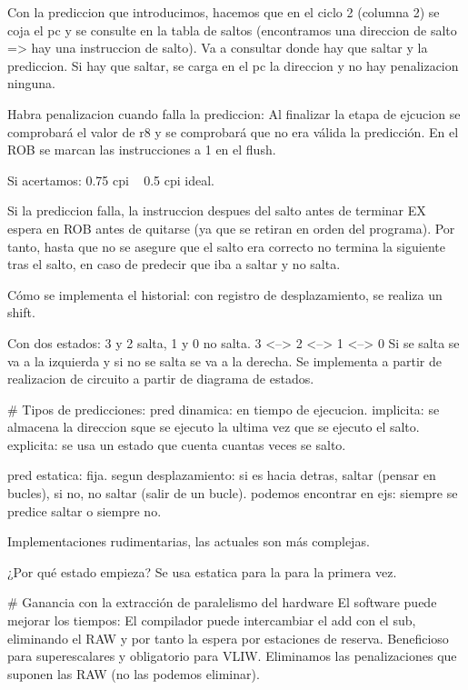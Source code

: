 Con la prediccion que introducimos, hacemos que en el ciclo 2 (columna 2) se coja el pc y se consulte en la tabla de saltos (encontramos una direccion de salto => hay una instruccion de salto). 
Va a consultar donde hay que saltar y la prediccion.
Si hay que saltar, se carga en el pc la direccion y no hay penalizacion ninguna.


Habra penalizacion cuando falla la prediccion:
Al finalizar la etapa de ejcucion se comprobará el valor de r8 y se comprobará que no era válida la predicción. En el ROB se marcan las instrucciones a 1 en el flush.

Si acertamos: 0.75 cpi ~ 0.5 cpi ideal.

Si la prediccion falla, la instruccion despues del salto antes de terminar EX espera en ROB antes de quitarse (ya que se retiran en orden del programa). Por tanto, hasta que no se asegure que el salto era correcto no termina la siguiente tras el salto, en caso de predecir que iba a saltar y no salta.



Cómo se implementa el historial: con registro de desplazamiento, se realiza un shift.

Con dos estados:
3 y 2 salta, 1 y 0 no salta.
3 <--> 2 <--> 1 <--> 0
Si se salta se va a la izquierda y si no se salta se va a la derecha.
Se implementa a partir de realizacion de circuito a partir de diagrama de estados.



# Tipos de predicciones:
pred dinamica: en tiempo de ejecucion.
    implicita: se almacena la direccion sque se ejecuto la ultima vez que se ejecuto el salto.
    explicita: se usa un estado que cuenta cuantas veces se salto.

pred estatica: fija.
    segun desplazamiento: si es hacia detras, saltar (pensar en bucles), si no, no saltar (salir de un bucle).
    podemos encontrar en ejs: siempre se predice saltar o siempre no.

Implementaciones rudimentarias, las actuales son más complejas.

¿Por qué estado empieza?
Se usa estatica para la para la primera vez.



# Ganancia con la extracción de paralelismo del hardware
El software puede mejorar los tiempos:
El compilador puede intercambiar el add con el sub, eliminando el RAW y por tanto la espera por estaciones de reserva.
Beneficioso para superescalares y obligatorio para VLIW. Eliminamos las penalizaciones que suponen las RAW (no las podemos eliminar).








